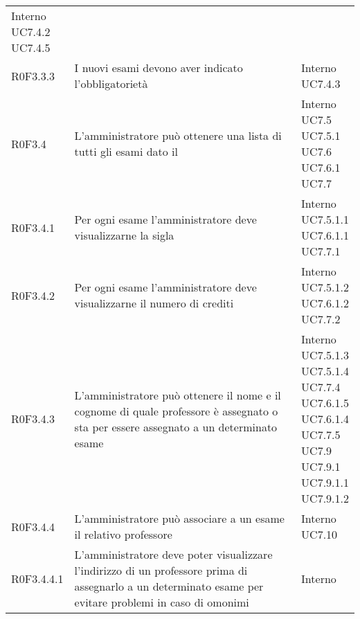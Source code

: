 \documentclass[AnalisiDeiRequisiti.tex]{subfiles}
\begin{document}
\begin{longtable}[H]{p{2cm}p{5.2cm}p{5cm}}
{		Interno \\ 
		UC7.4.2 \\
		UC7.4.5
	} \\
	R0F3.3.3 & I nuovi esami devono aver indicato l'obbligatorietà & \makecell[tl]{
		Interno \\ 
		UC7.4.3
	} \\
	R0F3.4 & L'amministratore può ottenere una lista di tutti gli esami dato il \citGloss{corso di laurea} & \makecell[tl]{
		Interno \\ 
		UC7.5 \\
		UC7.5.1 \\
		UC7.6 \\
		UC7.6.1 \\
		UC7.7
	} \\
	R0F3.4.1 & Per ogni esame l'amministratore deve visualizzarne la sigla & \makecell[tl]{
		Interno \\
		UC7.5.1.1 \\
		UC7.6.1.1 \\
		UC7.7.1
	} \\
	R0F3.4.2 & Per ogni esame l'amministratore deve visualizzarne il numero di crediti & \makecell[tl]{
		Interno \\
		UC7.5.1.2 \\
		UC7.6.1.2 \\
		UC7.7.2
	} \\
	R0F3.4.3 & L'amministratore può ottenere il nome e il cognome di quale professore è assegnato o sta per essere assegnato a un determinato esame & \makecell[tl]{
		Interno \\ 
		UC7.5.1.3 \\
		UC7.5.1.4 \\
		UC7.7.4 \\
		UC7.6.1.5 \\
		UC7.6.1.4 \\
		UC7.7.5 \\
		UC7.9 \\
		UC7.9.1 \\
		UC7.9.1.1 \\
		UC7.9.1.2
	} \\
	R0F3.4.4  & L'amministratore può associare a un esame il relativo professore & \makecell[tl]{
		Interno	 \\
		UC7.10 	
	} \\
	R0F3.4.4.1 & L'amministratore deve poter visualizzare l'indirizzo di un professore prima di assegnarlo a un determinato esame per evitare problemi in caso di omonimi & \makecell[tl]{
		Interno	 \\ 
}
\end{longtable}
\end{document}
